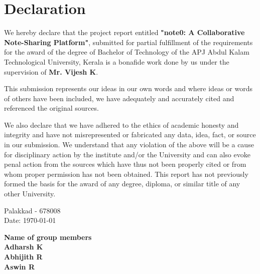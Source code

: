 \documentclass[12pt, a4paper]{report}
\begin{document}
\chapter*{\fontsize{24}{28}\selectfont Declaration}

We hereby declare that the project report entitled \textbf{"note0: A Collaborative Note-Sharing Platform"}, submitted for partial fulfillment of the requirements for the award of the degree of Bachelor of Technology of the APJ Abdul Kalam Technological University, Kerala is a bonafide work done by us under the supervision of \textbf{Mr. Vijesh K}.

\vspace{1cm}

This submission represents our ideas in our own words and where ideas or words of others have been included, we have adequately and accurately cited and referenced the original sources.

\vspace{1cm}

We also declare that we have adhered to the ethics of academic honesty and integrity and have not misrepresented or fabricated any data, idea, fact, or source in our submission. We understand that any violation of the above will be a cause for disciplinary action by the institute and/or the University and can also evoke penal action from the sources which have thus not been properly cited or from whom proper permission has not been obtained. This report has not previously formed the basis for the award of any degree, diploma, or similar title of any other University.

 
\vspace{1.5cm}
\noindent %
\begin{minipage}[t]{0.5\textwidth}
    \begin{flushleft} %
        Palakkad - 678008 \\
        \vspace{0.5cm}
        Date: \today
    \end{flushleft}
\end{minipage}%
\begin{minipage}[t]{0.5\textwidth}
    \begin{flushleft} %
        \textbf{Name of group members} \\
        \vspace{0.5cm} %
        \textbf{Adharsh K} \\
        \textbf{Abhijith R} \\
        \textbf{Aswin R} \\
    \end{flushleft}
\end{minipage}
\end{document}
